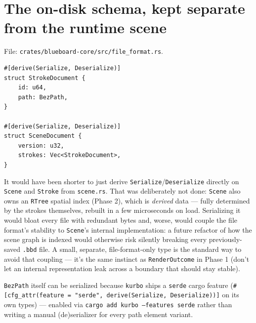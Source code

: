 \documentclass[11pt]{article}
\begin{document}
\section{The on-disk schema, kept separate from the runtime scene}
\label{sec:schema}
File: \texttt{crates/blueboard-core/src/file\_format.rs}.
\begin{lstlisting}
#[derive(Serialize, Deserialize)]
struct StrokeDocument {
    id: u64,
    path: BezPath,
}

#[derive(Serialize, Deserialize)]
struct SceneDocument {
    version: u32,
    strokes: Vec<StrokeDocument>,
}
\end{lstlisting}
It would have been shorter to just derive \texttt{Serialize}/\texttt{Deserialize} directly
on \texttt{Scene} and \texttt{Stroke} from \texttt{scene.rs}. That was deliberately not
done: \texttt{Scene} also owns an \texttt{RTree} spatial index (Phase 2), which is
\emph{derived} data — fully determined by the strokes themselves, rebuilt in a few
microseconds on load. Serializing it would bloat every file with redundant bytes and,
worse, would couple the file format's stability to \texttt{Scene}'s internal
implementation: a future refactor of how the scene graph is indexed would otherwise risk
silently breaking every previously-saved \texttt{.bbd} file. A small, separate,
file-format-only type is the standard way to avoid that coupling — it's the same instinct
as \texttt{RenderOutcome} in Phase 1 (don't let an internal representation leak across a
boundary that should stay stable).

\texttt{BezPath} itself can be serialized because \texttt{kurbo} ships a \texttt{serde}
cargo feature (\texttt{\#[cfg\_attr(feature = "serde", derive(Serialize, Deserialize))]}
on its own types) — enabled via \texttt{cargo add kurbo --features serde} rather than
writing a manual (de)serializer for every path element variant.
\end{document}

